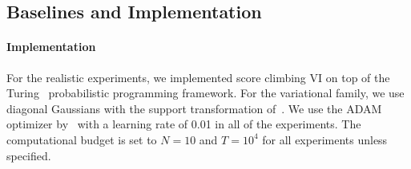 

\vspace{-0.05in}
\subsection{Baselines and Implementation}
\vspace{-0.05in}
\paragraph{Implementation}
For the realistic experiments, we implemented score climbing VI on top of the Turing~\citep{ge2018t} probabilistic programming framework.
For the variational family, we use diagonal Gaussians with the support transformation of~\citet{JMLR:v18:16-107}.
We use the ADAM optimizer by~\citet{kingma_adam_2015} with a learning rate of 0.01 in all of the experiments.
The computational budget is set to \(N=10\) and \(T=10^4\) for all experiments unless specified.

